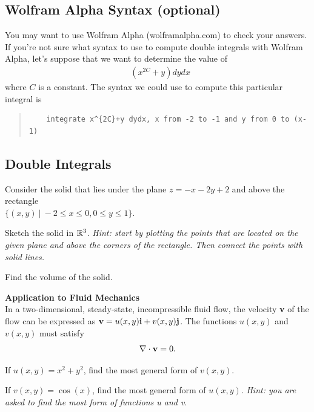 \setcounter{subsection}{-1}

\subsection{Wolfram Alpha Syntax (optional)}
You may want to use Wolfram Alpha (wolframalpha.com) to check your answers. If you're not sure what syntax to use to compute double integrals with Wolfram Alpha, let's suppose that we want to determine the value of
\begin{align*} 
   \mathop{\int_{-2}^{-1} \!  \int_0^{x-1}}( x^{2C} +y)  dy  dx
\end{align*}
where $C$ is a constant. The syntax we could use to compute this particular integral is
\begin{quote}
  \begin{verbatim}
    integrate x^{2C}+y dydx, x from -2 to -1 and y from 0 to (x-1)
  \end{verbatim}
\end{quote}
\subsection{Double Integrals}

\BEN
\item %
Consider the solid that lies under the plane $z = -x-2y+2$ and above the rectangle \\$\{(x,y) \ | \ -2\le x\le 0, 0\le y \le1 \}$.
\BEN
\item Sketch the solid in $\mathbb{R}^3$. \textit{Hint: start by plotting the points that are located on the given plane and above the corners of the rectangle. Then connect the points with solid lines.}
\item Find the volume of the solid.
\EEN
\item %
\textbf{Application to Fluid Mechanics} \\
In a two-dimensional, steady-state, incompressible fluid flow, the velocity \textbf{v} of the flow can be expressed as $\mathbf{v} = u(x,y)\mathbf{i} + v(x,y)\mathbf{j}$. The functions $u(x,y)$ and $v(x,y)$ must satisfy 
\begin{align*}
  \nabla\cdot\mathbf{v} = 0.
\end{align*}
\BEN
\item If $u(x,y) = x^2 + y^2$, find the most general form of $v(x,y)$. 
\item If $v(x,y) = \cos(x)$, find the most general form of $u(x,y)$.
\EEN
\textit{Hint: you are asked to find the most  form of functions u and v}.

